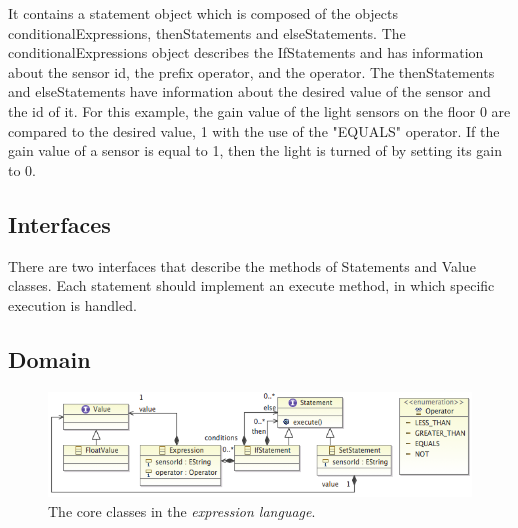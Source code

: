 It contains a statement object which is composed of the objects conditionalExpressions, thenStatements and elseStatements. 
The conditionalExpressions object describes the IfStatements and has information about the sensor id, the prefix operator, and the operator. The thenStatements and elseStatements have information about the desired value of the sensor and the id of it. 
For this example, the gain value of the light sensors on the floor 0 are compared to the desired value, 1 with the use of the "EQUALS" operator. If the gain value of a sensor is equal to 1, then the light is turned of by setting its gain to 0. 

\subsection{Interfaces}
There are two interfaces that describe the methods of Statements and Value classes. Each statement should implement an execute method, in which specific execution is handled.
 
\subsection{Domain} \label{s:Domain}

\begin{figure}[ht]
	\centering
    \includegraphics[scale=0.55]{chapters/implementation-model-expression-language.png} 
	\caption{The core classes in the \textit{expression language}.}
	\label{fig:ecore-sensors-actuators}
\end{figure}

